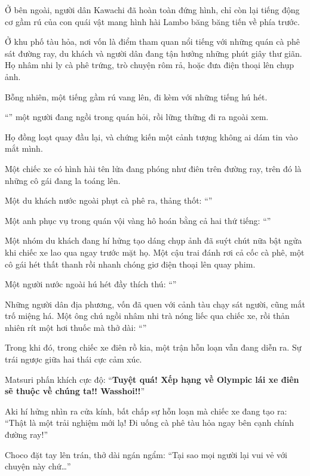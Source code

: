 \documentclass[../main.tex]{subfiles}
\begin{document}
Ở bên ngoài, người dân Kawachi đã hoàn toàn đứng hình, chỉ còn lại tiếng động cơ gầm rú của con quái vật mang hình hài Lambo băng băng tiến về phía trước.

Ở khu phố tàu hỏa, nơi vốn là điểm tham quan nổi tiếng với những quán cà phê sát đường ray, du khách và người dân đang tận hưởng những phút giây thư giãn. Họ nhâm nhi ly cà phê trứng, trò chuyện rôm rả, hoặc đưa điện thoại lên chụp ảnh.

Bỗng nhiên, một tiếng gầm rú vang lên, đi kèm với những tiếng hú hét.

``'' một người đang ngồi trong quán hỏi, rồi lững thững đi ra ngoài xem.

Họ đồng loạt quay đầu lại, và chứng kiến một cảnh tượng không ai dám tin vào mắt mình.

Một chiếc xe có hình hài tên lửa đang phóng như điên trên đường ray, trên đó là những cô gái đang la toáng lên.

Một du khách nước ngoài phụt cà phê ra, thảng thốt: ``''

Một anh phục vụ trong quán vội vàng hô hoán bằng cả hai thứ tiếng: ``''

Một nhóm du khách đang hí hửng tạo dáng chụp ảnh đã suýt chút nữa bật ngửa khi chiếc xe lao qua ngay trước mặt họ. Một cậu trai đánh rơi cả cốc cà phê, một cô gái hét thất thanh rồi nhanh chóng giơ điện thoại lên quay phim.

Một người nước ngoài hú hét đầy thích thú: ``\textbf{}''

Những người dân địa phương, vốn đã quen với cảnh tàu chạy sát người, cũng mắt trố miệng há. Một ông chú ngồi nhâm nhi trà nóng liếc qua chiếc xe, rồi thản nhiên rít một hơi thuốc mà thở dài: ``''

Trong khi đó, trong chiếc xe điên rồ kia, một trận hỗn loạn vẫn đang diễn ra. Sự trái ngược giữa hai thái cực cảm xúc.

Matsuri phấn khích cực độ: ``\textbf{Tuyệt quá! Xếp hạng về Olympic lái xe điên sẽ thuộc về chúng ta!! Wasshoi!!}''

Aki hí hửng nhìn ra cửa kính, bất chấp sự hỗn loạn mà chiếc xe đang tạo ra: ``Thật là một trải nghiệm mới lạ! Đi uống cà phê tàu hỏa ngay bên cạnh chính đường ray!''

Choco đặt tay lên trán, thở dài ngán ngẩm: ``Tại sao mọi người lại vui vẻ với chuyện này chứ\dots''
\end{document}
